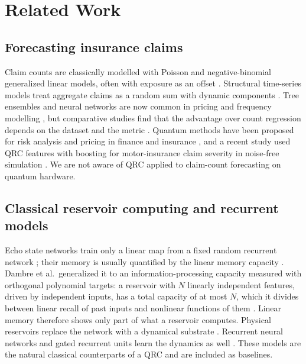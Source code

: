 \documentclass[journal]{IEEEtran}
\begin{document}
\section{Related Work}
\subsection{Forecasting insurance claims}
Claim counts are classically modelled with Poisson and negative-binomial generalized linear models, often with exposure as an offset \cite{Nelder1972GLM,Cameron2013Count,Wuthrich2023Actuarial}. Structural time-series models treat aggregate claims as a random sum with dynamic components \cite{Harvey1989Claims}. Tree ensembles and neural networks are now common in pricing and frequency modelling \cite{Henckaerts2021Boosting,Wuthrich2023Actuarial}, but comparative studies find that the advantage over count regression depends on the dataset and the metric \cite{Alomair2024Count}. Quantum methods have been proposed for risk analysis and pricing in finance and insurance \cite{Egger2020Finance}, and a recent study used QRC features with boosting for motor-insurance claim severity in noise-free simulation \cite{Tamturk2026Insurance}. We are not aware of QRC applied to claim-count forecasting on quantum hardware.

\subsection{Classical reservoir computing and recurrent models}
Echo state networks train only a linear map from a fixed random recurrent network \cite{Jaeger2004ESN,Lukosevicius2009RC}; their memory is usually quantified by the linear memory capacity \cite{Jaeger2002STM}. Dambre et al.\ generalized it to an information-processing capacity measured with orthogonal polynomial targets: a reservoir with $N$ linearly independent features, driven by independent inputs, has a total capacity of at most $N$, which it divides between linear recall of past inputs and nonlinear functions of them \cite{Dambre2012Capacity}. Linear memory therefore shows only part of what a reservoir computes. Physical reservoirs replace the network with a dynamical substrate \cite{Tanaka2019Physical}. Recurrent neural networks and gated recurrent units learn the dynamics as well \cite{Elman1990RNN,Cho2014GRU}. These models are the natural classical counterparts of a QRC and are included as baselines.
\end{document}
